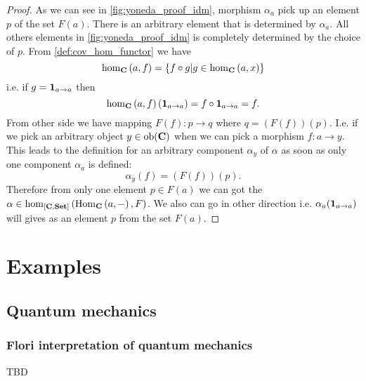 \begin{lemma}[Yoneda]
\begin{proof}
As we can see in \cref{fig:yoneda_proof_idm}, morphism $\alpha_a$
pick up an element $p$ of the set $F(a)$. There is an arbitrary
element that is determined by $\alpha_a$. All others elements in
\cref{fig:yoneda_proof_idm} is completely determined by the choice of
$p$. From \cref{def:cov_hom_functor} we have
\[
\catmset[C]{a}{f} = \{f \circ g | g \in \catmset[C]{a}{x}\}
\]
i.e. if $g = \mathbf{1}_{ a \to a }$ then 
\[
\catmset[C]{a}{f}\left(\idm{a}\right) = f
\circ \idm{a} = f.
\]
From other side we have mapping $F(f): p \to q$ where 
$q = (F(f))(p)$. I.e. if we pick an arbitrary object $y \in \mathrm{ob}(\mathbf{C})$
when we can pick a morphism $f: a \to y$. This leads to the definition
for an arbitrary component $\alpha_y$ of  $\alpha$
as soon as only one component $\alpha_a$ is defined:
\[
\alpha_y(f) = (F(f))(p).
\]
Therefore from only one element $p \in F(a)$ we can got the
 $\alpha \in
\catmset[\funcat{C}{Set}]{\catcovhom{C}{a}}{F}$. We also can go in
other direction i.e. $\alpha_a(\mathbf{1}_{ a \to a })$ will gives as an element $p$
from the set $F(a)$.
\end{proof}
\end{lemma}

\section{Examples}

\subsection{Quantum mechanics}

\subsubsection{Flori interpretation of quantum mechanics}
TBD
